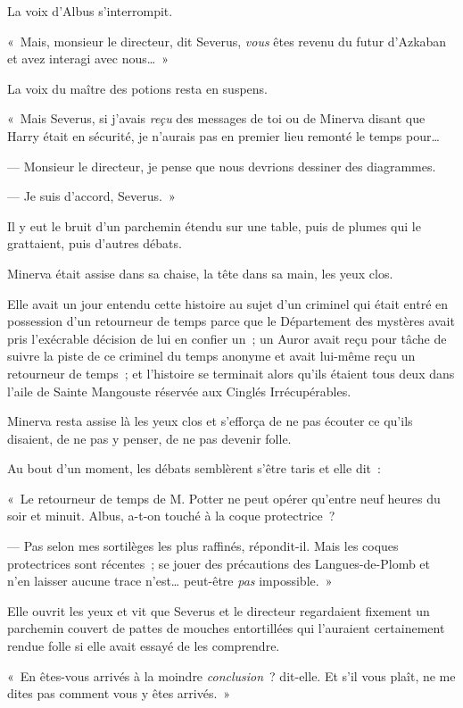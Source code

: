 La voix d'Albus s'interrompit.

«~Mais, monsieur le directeur, dit Severus, \emph{vous} êtes revenu du futur d'Azkaban et avez interagi avec nous…~»

La voix du maître des potions resta en suspens.

«~Mais Severus, si j'avais \emph{reçu} des messages de toi ou de Minerva disant que Harry était en sécurité, je n'aurais pas en premier lieu remonté le temps pour…

--- Monsieur le directeur, je pense que nous devrions dessiner des diagrammes.

--- Je suis d'accord, Severus.~»

Il y eut le bruit d'un parchemin étendu sur une table, puis de plumes qui le grattaient, puis d'autres débats.

Minerva était assise dans sa chaise, la tête dans sa main, les yeux clos.

Elle avait un jour entendu cette histoire au sujet d'un criminel qui était entré en possession d'un retourneur de temps parce que le Département des mystères avait pris l'exécrable décision de lui en confier un~; un Auror avait reçu pour tâche de suivre la piste de ce criminel du temps anonyme et avait lui-même reçu un retourneur de temps~; et l'histoire se terminait alors qu'ils étaient tous deux dans l'aile de Sainte Mangouste réservée aux Cinglés Irrécupérables.

Minerva resta assise là les yeux clos et s'efforça de ne pas écouter ce qu'ils disaient, de ne pas y penser, de ne pas devenir folle.

Au bout d'un moment, les débats semblèrent s'être taris et elle dit~:

«~Le retourneur de temps de M. Potter ne peut opérer qu'entre neuf heures du soir et minuit.
Albus, a-t-on touché à la coque protectrice~?

--- Pas selon mes sortilèges les plus raffinés, répondit-il.
Mais les coques protectrices sont récentes~; se jouer des précautions des Langues-de-Plomb et n'en laisser aucune trace n'est… peut-être \emph{pas} impossible.~»

Elle ouvrit les yeux et vit que Severus et le directeur regardaient fixement un parchemin couvert de pattes de mouches entortillées qui l'auraient certainement rendue folle si elle avait essayé de les comprendre.

«~En êtes-vous arrivés à la moindre \emph{conclusion}~? dit-elle.
Et s'il vous plaît, ne me dites pas comment vous y êtes arrivés.~»

